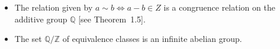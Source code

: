 \begin{itemize}
    \item[(a)] The relation given by $a\sim b\Leftrightarrow a-b\in Z$
    is a congruence relation on the additive group $\mathbb{Q}$ [see Theorem~1.5].
    \item[(b)] The set $\mathbb{Q}/\mathbb{Z}$ of equivalence classes
    is an infinite abelian group.
\end{itemize}